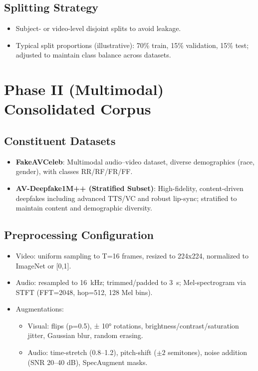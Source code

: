 \subsection{Splitting Strategy}
\begin{itemize}
    \item Subject- or video-level disjoint splits to avoid leakage.
    \item Typical split proportions (illustrative): 70\% train, 15\% validation, 15\% test; adjusted to maintain class balance across datasets.
\end{itemize}

\section{Phase II (Multimodal) Consolidated Corpus}
\subsection{Constituent Datasets}
\begin{itemize}
    \item \textbf{FakeAVCeleb}: Multimodal audio--video dataset, diverse demographics (race, gender), with classes RR/RF/FR/FF.
    \item \textbf{AV-Deepfake1M++ (Stratified Subset)}: High-fidelity, content-driven deepfakes including advanced TTS/VC and robust lip-sync; stratified to maintain content and demographic diversity.
\end{itemize}

\subsection{Preprocessing Configuration}
\begin{itemize}
    \item Video: uniform sampling to T=16 frames, resized to 224x224, normalized to ImageNet or [0,1].
    \item Audio: resampled to 16~kHz; trimmed/padded to 3~s; Mel-spectrogram via STFT (FFT=2048, hop=512, 128 Mel bins).
    \item Augmentations:
    \begin{itemize}
        \item Visual: flips (p=0.5), ± 10° rotations, brightness/contrast/saturation jitter, Gaussian blur, random erasing.
        \item Audio: time-stretch (0.8--1.2), pitch-shift ($\pm 2$ semitones), noise addition (SNR 20--40 dB), SpecAugment masks.
    \end{itemize}
\end{itemize}

